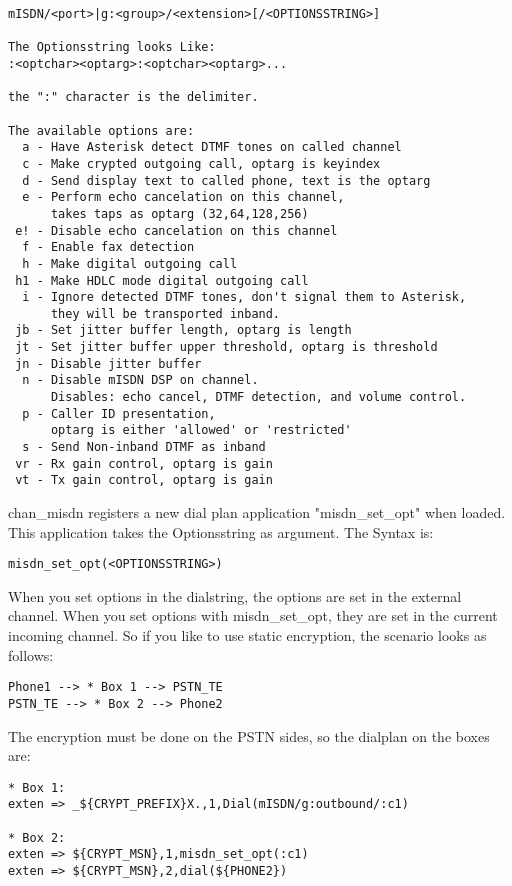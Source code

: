\begin{astlisting}
\begin{verbatim}
mISDN/<port>|g:<group>/<extension>[/<OPTIONSSTRING>]

The Optionsstring looks Like:
:<optchar><optarg>:<optchar><optarg>...

the ":" character is the delimiter.

The available options are:
  a - Have Asterisk detect DTMF tones on called channel
  c - Make crypted outgoing call, optarg is keyindex
  d - Send display text to called phone, text is the optarg
  e - Perform echo cancelation on this channel,
      takes taps as optarg (32,64,128,256)
 e! - Disable echo cancelation on this channel
  f - Enable fax detection
  h - Make digital outgoing call
 h1 - Make HDLC mode digital outgoing call
  i - Ignore detected DTMF tones, don't signal them to Asterisk,
      they will be transported inband.
 jb - Set jitter buffer length, optarg is length
 jt - Set jitter buffer upper threshold, optarg is threshold
 jn - Disable jitter buffer
  n - Disable mISDN DSP on channel.
      Disables: echo cancel, DTMF detection, and volume control.
  p - Caller ID presentation,
      optarg is either 'allowed' or 'restricted'
  s - Send Non-inband DTMF as inband
 vr - Rx gain control, optarg is gain
 vt - Tx gain control, optarg is gain
\end{verbatim}
\end{astlisting}

chan\_misdn registers a new dial plan application "misdn\_set\_opt" when
loaded. This application takes the Optionsstring as argument. The Syntax is:

\begin{verbatim}
misdn_set_opt(<OPTIONSSTRING>)
\end{verbatim}

When you set options in the dialstring, the options are set in the external
channel. When you set options with misdn\_set\_opt, they are set in the current
incoming channel. So if you like to use static encryption, the scenario looks
as follows:

\begin{verbatim}
Phone1 --> * Box 1 --> PSTN_TE
PSTN_TE --> * Box 2 --> Phone2
\end{verbatim}

The encryption must be done on the PSTN sides, so the dialplan on the boxes
are:

\begin{verbatim}
* Box 1:
exten => _${CRYPT_PREFIX}X.,1,Dial(mISDN/g:outbound/:c1)

* Box 2:
exten => ${CRYPT_MSN},1,misdn_set_opt(:c1)
exten => ${CRYPT_MSN},2,dial(${PHONE2})
\end{verbatim}


